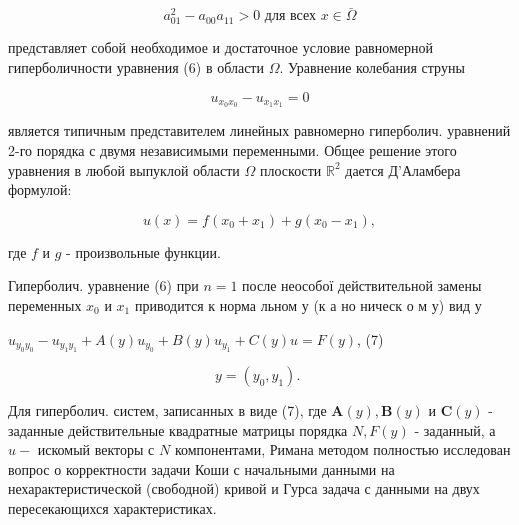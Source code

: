 \documentclass[10pt]{article}
\begin{document}
\[

a_{01}^{2}-a_{00} a_{11}>0 \text { для всех } x \in \bar{\Omega}

\]



представляет собой необходимое и достаточное условие равномерной гиперболичности уравнения (6) в области $\Omega$. Уравнение колебания струны



\[

u_{x_{0} x_{0}}-u_{x_{1} x_{1}}=0

\]



является типичным представителем линейных равномерно гиперболич. уравнений 2-го порядка с двумя независимыми переменными. Общее решение этого уравнения в любой выпуклой области $\Omega$ плоскости $\mathbb{R}^{2}$ дается Д'Аламбера формулой:



\[

u(x)=f\left(x_{0}+x_{1}\right)+g\left(x_{0}-x_{1}\right),

\]



где $f$ и $g$ - произвольные функции.



Гиперболич. уравнение (6) при $n=1$ после неособої действительной замены переменных $x_{0}$ и $x_{1}$ приводится к норма льном у (к а но ническ о м у) вид у



$u_{y_{0} y_{0}}-u_{y_{1} y_{1}}+A(y) u_{y_{0}}+B(y) u_{y_{1}}+C(y) u=F(y)$, (7)



\[

y=\left(y_{0}, y_{1}\right) \text {. }

\]



Для гиперболич. систем, записанных в виде (7), где $\boldsymbol{A}(y), \boldsymbol{B}(y)$ и $\boldsymbol{C}(y)$ - заданные действительные квадратные матрицы порядка $N, F(y)$ - заданный, а $u-$ искомый векторы с $N$ компонентами, Римана методом полностью исследован вопрос о корректности задачи Коши с начальными данными на нехарактеристической (свободной) кривой и Гурса задача с данными на двух пересекающихся характеристиках.
\end{document}
